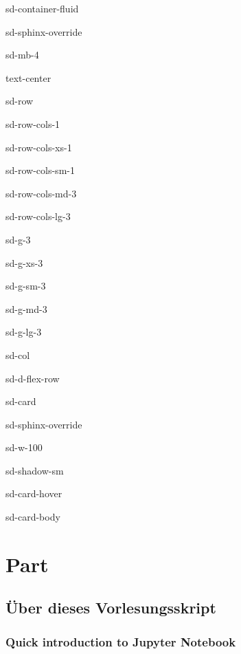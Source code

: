 \documentclass[letterpaper,10pt,english]{jupyterBook}
\begin{document}
\begin{sphinxuseclass}{sd-container-fluid}
\begin{sphinxuseclass}{sd-sphinx-override}
\begin{sphinxuseclass}{sd-mb-4}
\begin{sphinxuseclass}{text-center}
\begin{sphinxuseclass}{sd-row}
\begin{sphinxuseclass}{sd-row-cols-1}
\begin{sphinxuseclass}{sd-row-cols-xs-1}
\begin{sphinxuseclass}{sd-row-cols-sm-1}
\begin{sphinxuseclass}{sd-row-cols-md-3}
\begin{sphinxuseclass}{sd-row-cols-lg-3}
\begin{sphinxuseclass}{sd-g-3}
\begin{sphinxuseclass}{sd-g-xs-3}
\begin{sphinxuseclass}{sd-g-sm-3}
\begin{sphinxuseclass}{sd-g-md-3}
\begin{sphinxuseclass}{sd-g-lg-3}
\begin{sphinxuseclass}{sd-col}
\begin{sphinxuseclass}{sd-d-flex-row}
\begin{sphinxuseclass}{sd-card}
\begin{sphinxuseclass}{sd-sphinx-override}
\begin{sphinxuseclass}{sd-w-100}
\begin{sphinxuseclass}{sd-shadow-sm}
\begin{sphinxuseclass}{sd-card-hover}
\begin{sphinxuseclass}{sd-card-body}
\end{sphinxuseclass}{\hyperref[\detokenize{content/4_Sensoren::doc}]{}}
\end{sphinxuseclass}
\end{sphinxuseclass}
\end{sphinxuseclass}
\end{sphinxuseclass}
\end{sphinxuseclass}
\end{sphinxuseclass}
\end{sphinxuseclass}
\end{sphinxuseclass}
\end{sphinxuseclass}
\end{sphinxuseclass}
\end{sphinxuseclass}
\end{sphinxuseclass}
\end{sphinxuseclass}
\end{sphinxuseclass}
\end{sphinxuseclass}
\end{sphinxuseclass}
\end{sphinxuseclass}
\end{sphinxuseclass}
\end{sphinxuseclass}
\end{sphinxuseclass}
\end{sphinxuseclass}
\end{sphinxuseclass}
\sphinxstepscope


\part{Part}

\sphinxstepscope


\chapter{Über dieses Vorlesungsskript}
\label{\detokenize{content/00_jupyter:uber-dieses-vorlesungsskript}}\label{\detokenize{content/00_jupyter::doc}}

\section{Quick introduction to Jupyter Notebook}
\label{\detokenize{content/00_jupyter:quick-introduction-to-jupyter-notebook}}
\end{document}
